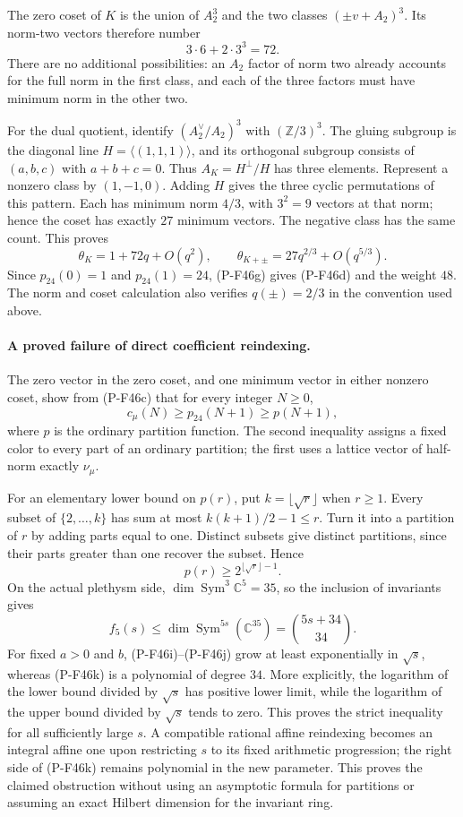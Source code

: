 The zero coset of $K$ is the union of $A_2^3$ and
the two classes $(\pm v+A_2)^3$. Its norm-two
vectors therefore number
\[
                         3\cdot6+2\cdot3^3=72.
\]
There are no additional possibilities: an $A_2$
factor of norm two already accounts for the full
norm in the first class, and each of the three
factors must have minimum norm in the other two.

For the dual quotient, identify
$(A_2^\vee/A_2)^3$ with $(\mathbb Z/3)^3$.
The gluing subgroup is the diagonal line
$H=\langle(1,1,1)\rangle$, and its orthogonal
subgroup consists of $(a,b,c)$ with $a+b+c=0$.
Thus $A_K=H^\perp/H$ has three elements.
Represent a nonzero class by $(1,-1,0)$.
Adding $H$ gives the three cyclic permutations
of this pattern. Each has minimum norm $4/3$,
with $3^2=9$ vectors at that norm; hence the
coset has exactly $27$ minimum vectors.
The negative class has the same count. This proves
\[
 \theta_K=1+72q+O(q^2),\qquad
 \theta_{K+\pm}=27q^{2/3}+O(q^{5/3}).
 \tag{P-F46g}
\]
Since $p_{24}(0)=1$ and $p_{24}(1)=24$,
(P-F46g) gives (P-F46d) and the weight $48$.
The norm and coset calculation also verifies
$q(\pm)=2/3$ in the convention used above.

\paragraph{A proved failure of direct coefficient reindexing.}
The zero vector in the zero coset, and one minimum vector
in either nonzero coset, show from (P-F46c) that for
every integer $N\ge0$,
\[
                         c_\mu(N)\ge p_{24}(N+1)
                                            \ge p(N+1),
 \tag{P-F46i}
\]
where $p$ is the ordinary partition function. The second
inequality assigns a fixed color to every part of an
ordinary partition; the first uses a lattice vector
of half-norm exactly $\nu_\mu$.

For an elementary lower bound on $p(r)$, put
$k=\lfloor\sqrt r\rfloor$ when $r\ge1$.
Every subset of $\{2,\ldots,k\}$ has sum at most
$k(k+1)/2-1\le r$. Turn it into a partition of $r$
by adding parts equal to one. Distinct subsets give
distinct partitions, since their parts greater than
one recover the subset. Hence
\[
                         p(r)\ge2^{\lfloor\sqrt r\rfloor-1}.
 \tag{P-F46j}
\]
On the actual plethysm side, $\dim\operatorname{Sym}^3
\mathbb C^5=35$, so the inclusion of invariants gives
\[
       f_5(s)\le
       \dim\operatorname{Sym}^{5s}(\mathbb C^{35})
                       =\binom{5s+34}{34}.
 \tag{P-F46k}
\]
For fixed $a>0$ and $b$, (P-F46i)--(P-F46j) grow at
least exponentially in $\sqrt s$, whereas (P-F46k)
is a polynomial of degree $34$. More explicitly,
the logarithm of the lower bound divided by $\sqrt s$
has positive lower limit, while the logarithm of the
upper bound divided by $\sqrt s$ tends to zero.
This proves the strict inequality for all sufficiently
large $s$. A compatible rational affine reindexing
becomes an integral affine one upon restricting $s$
to its fixed arithmetic progression; the right side
of (P-F46k) remains polynomial in the new parameter.
This proves the claimed obstruction without using
an asymptotic formula for partitions or assuming
an exact Hilbert dimension for the invariant ring.


